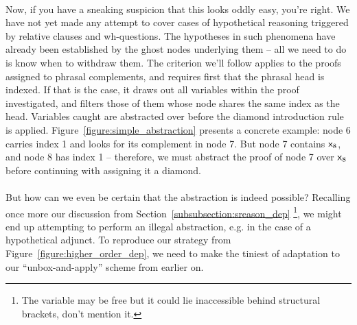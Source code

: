 \paragraph{\todo}
Now, if you have a sneaking suspicion that this looks oddly easy, you're right.
We have not yet made any attempt to cover cases of hypothetical reasoning triggered by relative clauses and wh-questions.
The hypotheses in such phenomena have already been established by the ghost nodes underlying them -- all we need to do is know when to withdraw them.
The criterion we'll follow applies to the proofs assigned to phrasal complements, and requires first that the phrasal head is indexed.
If that is the case, it draws out all variables within the proof investigated, and filters those of them whose node shares the same index as the head.
Variables caught are abstracted over before the diamond introduction rule is applied.
Figure~\ref{figure:simple_abstraction} presents a concrete example: node 6 carries index 1 and looks for its complement in node 7.
But node 7 contains $\mathsf{x}_{\mathnormal{8}}$, and node 8 has index 1 -- therefore, we must abstract the proof of node 7 over $\mathsf{x}_{\mathnormal{8}}$ before continuing with assigning it a diamond.

\paragraph{\todo}
But how can we even be certain that the abstraction is indeed possible?
Recalling once more our discussion from Section~\ref{subsubsection:sreason_dep}%
	\footnote{The variable may be free but it could lie inaccessible behind structural brackets, don't mention it.},
we might end up attempting to perform an illegal abstraction, e.g. in the case of a hypothetical adjunct.
To reproduce our strategy from Figure~\ref{figure:higher_order_dep}, we need to make the tiniest of adaptation to our ``unbox-and-apply'' scheme from earlier on.




